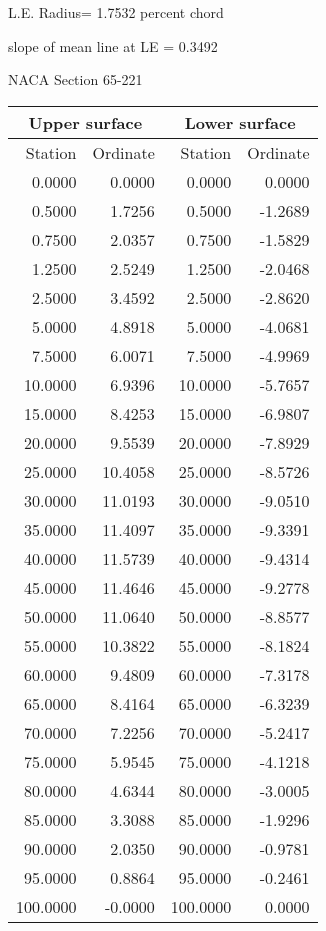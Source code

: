 \documentclass[11pt]{book}
\begin{document}
L.E. Radius=  1.7532 percent chord


 slope of mean line at LE =  0.3492
 \newpage
  \label{s65-221}
 \begin{Large}
 NACA Section 65-221
 \end{Large}
  
 \vspace{8mm}
 \begin{tabular}{|r|r|r|r|} \hline 
 \multicolumn{2}{|c|}{Upper surface} & \multicolumn{2}{|c|}{Lower surface} \\
 \hline
 Station & Ordinate & Station & Ordinate \\
 \hline
0.0000 & 0.0000 & 0.0000 & 0.0000 \\
0.5000 & 1.7256 & 0.5000 & -1.2689 \\
0.7500 & 2.0357 & 0.7500 & -1.5829 \\
1.2500 & 2.5249 & 1.2500 & -2.0468 \\
2.5000 & 3.4592 & 2.5000 & -2.8620 \\
5.0000 & 4.8918 & 5.0000 & -4.0681 \\
7.5000 & 6.0071 & 7.5000 & -4.9969 \\
10.0000 & 6.9396 & 10.0000 & -5.7657 \\
15.0000 & 8.4253 & 15.0000 & -6.9807 \\
20.0000 & 9.5539 & 20.0000 & -7.8929 \\
25.0000 & 10.4058 & 25.0000 & -8.5726 \\
30.0000 & 11.0193 & 30.0000 & -9.0510 \\
35.0000 & 11.4097 & 35.0000 & -9.3391 \\
40.0000 & 11.5739 & 40.0000 & -9.4314 \\
45.0000 & 11.4646 & 45.0000 & -9.2778 \\
50.0000 & 11.0640 & 50.0000 & -8.8577 \\
55.0000 & 10.3822 & 55.0000 & -8.1824 \\
60.0000 & 9.4809 & 60.0000 & -7.3178 \\
65.0000 & 8.4164 & 65.0000 & -6.3239 \\
70.0000 & 7.2256 & 70.0000 & -5.2417 \\
75.0000 & 5.9545 & 75.0000 & -4.1218 \\
80.0000 & 4.6344 & 80.0000 & -3.0005 \\
85.0000 & 3.3088 & 85.0000 & -1.9296 \\
90.0000 & 2.0350 & 90.0000 & -0.9781 \\
95.0000 & 0.8864 & 95.0000 & -0.2461 \\
100.0000 & -0.0000 & 100.0000 & 0.0000 \\
 \hline 
 \end{tabular}
\end{document}
